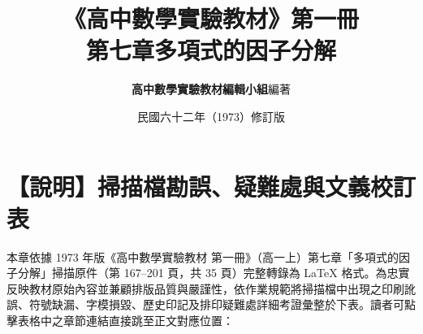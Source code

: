 \documentclass[a4paper,12pt,twoside]{article}
\title{\LARGE\textbf{《高中數學實驗教材》第一冊}\\[0.5em] \Large\textbf{第七章\quad 多項式的因子分解}}
\author{\textbf{高中數學實驗教材編輯小組}\quad 編著}
\date{民國六十二年（1973）修訂版}
\begin{document}
\maketitle
\thispagestyle{firstpage}

\section*{【說明】掃描檔勘誤、疑難處與文義校訂表}
\label{sec:master_errata_notes}

本章依據 1973 年版《高中數學實驗教材 第一冊》（高一上）第七章「多項式的因子分解」掃描原件（第 167--201 頁，共 35 頁）完整轉錄為 \LaTeX{} 格式。為忠實反映教材原始內容並兼顧排版品質與嚴謹性，依作業規範將掃描檔中出現之印刷訛誤、符號缺漏、字模損毀、歷史印記及排印疑難處詳細考證彙整於下表。讀者可點擊表格中之章節連結直接跳至正文對應位置：
\end{document}
